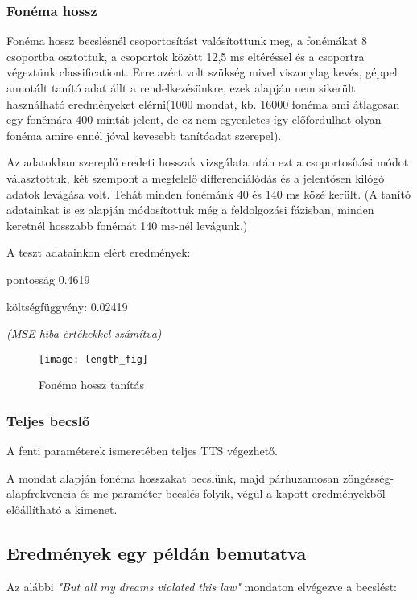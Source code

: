 \subsubsection{Fonéma hossz}
Fonéma hossz becslésnél csoportosítást valósítottunk meg, a fonémákat 8 csoportba osztottuk, a csoportok között 12,5 ms eltéréssel és a csoportra végeztünk classificationt. Erre azért volt szükség mivel viszonylag kevés, géppel annotált tanító adat állt a rendelkezésünkre, ezek alapján nem sikerült használható eredményeket elérni(1000 mondat, kb. 16000 fonéma ami átlagosan egy fonémára 400 mintát jelent, de ez nem egyenletes így előfordulhat olyan fonéma amire ennél jóval kevesebb tanítóadat szerepel). 

Az adatokban szereplő eredeti hosszak vizsgálata után ezt a csoportosítási módot választottuk, két szempont a megfelelő differenciálódás és a jelentősen kilógó adatok levágása volt. Tehát minden fonémánk 40 és 140 ms közé került. (A tanító adatainkat is ez alapján módosítottuk még a feldolgozási fázisban, minden keretnél hosszabb fonémát 140 ms-nél levágunk.)


A teszt adatainkon elért eredmények:
	
pontosság 0.4619
	
költségfüggvény: 0.02419
	
\textit{(MSE hiba értékekkel számítva)}

\begin{figure}[h]
	\par\centering	
	\texttt{[image: length\_fig]}
	\caption{Fonéma hossz tanítás}
\end{figure}
\subsubsection{Teljes becslő}
A fenti paraméterek ismeretében teljes TTS végezhető. 

A mondat alapján fonéma hosszakat becslünk, majd párhuzamosan zöngésség-alapfrekvencia és mc paraméter becslés folyik, végül a kapott eredményekből előállítható a kimenet.
\clearpage
\subsection{Eredmények egy példán bemutatva}
Az alábbi {\it"But all my dreams violated this law"} mondaton elvégezve a becslést:
